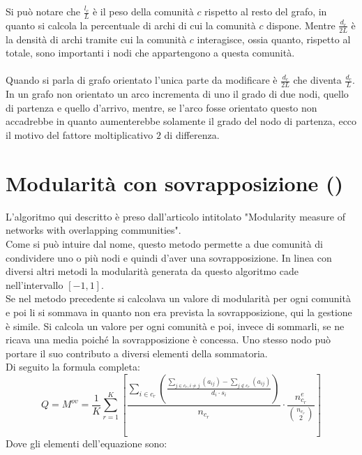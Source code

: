 %
Si può notare che $\frac{l_c}{L}$ è il peso della comunità $c$ rispetto al resto del grafo, in quanto si calcola la percentuale di archi di cui la comunità $c$ dispone. Mentre $\frac{d_c}{2L}$ è la densità di archi tramite cui la comunità $c$ interagisce, ossia quanto, rispetto al totale, sono importanti i nodi che appartengono a questa comunità.\\
\\
Quando si parla di grafo orientato l'unica parte da modificare è $\frac{d_c}{2L}$ che diventa $\frac{d_c}{L}$. In un grafo non orientato un arco incrementa di uno il grado di due nodi, quello  di partenza e quello d'arrivo, mentre, se l'arco fosse orientato questo non accadrebbe in quanto aumenterebbe solamente il grado del nodo di partenza, ecco il motivo del fattore moltiplicativo $2$ di differenza.
%
%
\section{Modularità con sovrapposizione (\mover)}
L'algoritmo qui descritto è preso dall'articolo intitolato "Modularity measure of networks with overlapping communities"\cite{M-over_paper}.\\
Come si può intuire dal nome, questo metodo permette a due comunità di condividere uno o più nodi e quindi d'aver una sovrapposizione. In linea con diversi altri metodi la modularità generata da questo algoritmo cade nell'intervallo $[-1, 1]$.\\
Se nel metodo precedente si calcolava un valore di modularità per ogni comunità e poi li si sommava in quanto non era prevista la sovrapposizione, qui la gestione è simile. Si calcola un valore per ogni comunità e poi, invece di sommarli, se ne ricava una media poiché la sovrapposizione è concessa. Uno stesso nodo può portare il suo contributo a diversi elementi della sommatoria.\\
Di seguito la formula completa:
\begin{equation}
	Q = M^{ov} = \frac{1}{K} 
	\sum_{r=1}^{K} \left[
		\frac
			{\sum\limits_{i \in c_r} 
				\left( \frac
					{
						\sum\limits_{j \in c_r, i \neq j} \left( a_{ij} \right) 
						- 
						\sum\limits_{j \notin c_r} \left( a_{ij} \right) 
					} 
					{d_i \cdot s_i} 
				\right) } 
			{n_{c_r}}
		\cdot
		\frac{ n^e_{c_r} }{ \binom{n_{c_r}}{2} } 
	\right]
	\label{eq:m_over}
\end{equation}
Dove gli elementi dell'equazione sono:
